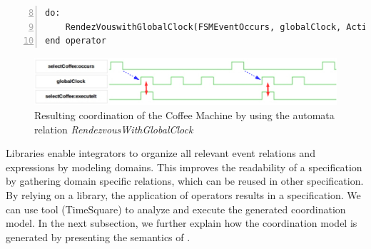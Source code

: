 \begin{lstlisting}[language=bcool,
caption={\bcool specification of the modified running example operator between the TFSM and Activity languages by using the library},
label={lst:bcoolrunningexamplellib}, 
basicstyle=\scriptsize\ttfamily, backgroundcolor=\color{LGrey}, numbers=left, firstnumber=8, xleftmargin=2pt]
do: 
	RendezVouswithGlobalClock(FSMEventOccurs, globalClock, ActionExecute)
end operator
\end{lstlisting}

  
\begin{figure}
	\center
	\includegraphics[width=.9\textwidth]{bcool/figs/libvcd}
	\caption{Resulting coordination of the Coffee Machine by using the automata relation \emph{RendezvousWithGlobalClock}}
	\label{fig:libvcd}
\end{figure}





Libraries enable integrators to organize all relevant event relations and expressions by modeling domains. This improves the readability of a \bcool specification by gathering domain specific relations, which can be reused in other specification. By relying on a \moccml library, the application of \bcool operators results in a \ccsl specification. We can use \ccsl tool (\eg TimeSquare\cite{timesquarebib}) to analyze and execute the generated coordination model. In the next subsection, we further explain how the coordination model is generated by presenting the semantics of \bcool.   



